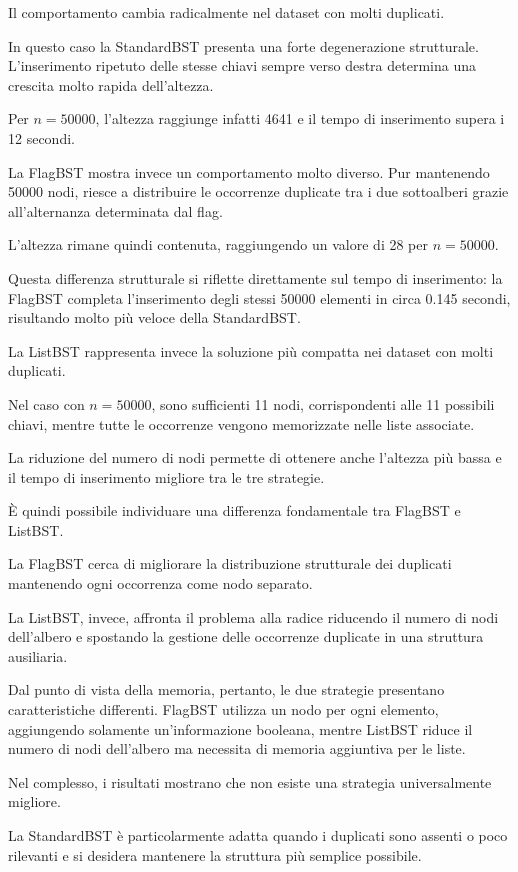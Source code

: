 \documentclass[a4paper,12pt]{article}
\begin{document}
Il comportamento cambia radicalmente nel dataset con molti duplicati.

In questo caso la StandardBST presenta una forte degenerazione strutturale. L'inserimento ripetuto delle stesse chiavi sempre verso destra determina una crescita molto rapida dell'altezza.

Per $n=50000$, l'altezza raggiunge infatti 4641 e il tempo di inserimento supera i 12 secondi.

La FlagBST mostra invece un comportamento molto diverso. Pur mantenendo 50000 nodi, riesce a distribuire le occorrenze duplicate tra i due sottoalberi grazie all'alternanza determinata dal flag.

L'altezza rimane quindi contenuta, raggiungendo un valore di 28 per $n=50000$.

Questa differenza strutturale si riflette direttamente sul tempo di inserimento: la FlagBST completa l'inserimento degli stessi 50000 elementi in circa 0.145 secondi, risultando molto più veloce della StandardBST.

La ListBST rappresenta invece la soluzione più compatta nei dataset con molti duplicati.

Nel caso con $n=50000$, sono sufficienti 11 nodi, corrispondenti alle 11 possibili chiavi, mentre tutte le occorrenze vengono memorizzate nelle liste associate.

La riduzione del numero di nodi permette di ottenere anche l'altezza più bassa e il tempo di inserimento migliore tra le tre strategie.

È quindi possibile individuare una differenza fondamentale tra FlagBST e ListBST.

La FlagBST cerca di migliorare la distribuzione strutturale dei duplicati mantenendo ogni occorrenza come nodo separato.

La ListBST, invece, affronta il problema alla radice riducendo il numero di nodi dell'albero e spostando la gestione delle occorrenze duplicate in una struttura ausiliaria.

Dal punto di vista della memoria, pertanto, le due strategie presentano caratteristiche differenti. FlagBST utilizza un nodo per ogni elemento, aggiungendo solamente un'informazione booleana, mentre ListBST riduce il numero di nodi dell'albero ma necessita di memoria aggiuntiva per le liste.

Nel complesso, i risultati mostrano che non esiste una strategia universalmente migliore.

La StandardBST è particolarmente adatta quando i duplicati sono assenti o poco rilevanti e si desidera mantenere la struttura più semplice possibile.
\end{document}
